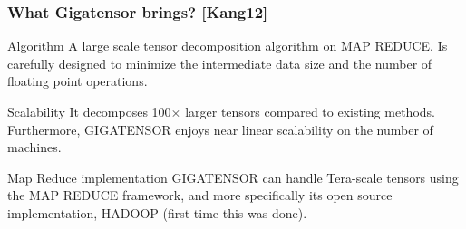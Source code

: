 \begin{frame}[plain]
	\frametitle{What Gigatensor brings? [Kang12]}
	\begin{block}{Algorithm}
    A large scale tensor
    decomposition algorithm on MAP REDUCE. Is carefully designed to
    minimize the intermediate data size 
    and the number of floating point operations.
	\end{block}
	\begin{block}{Scalability}
    It decomposes 100$\times$ larger tensors
    compared to existing methods. Furthermore, GIGATENSOR enjoys
    near linear scalability on the number of machines.
	\end{block}
	\begin{block}{Map Reduce implementation}
    GIGATENSOR can handle Tera-scale tensors using the MAP REDUCE
    framework,  and more specifically its open source implementation,
    HADOOP (first time this was done).
	\end{block}
\end{frame}
